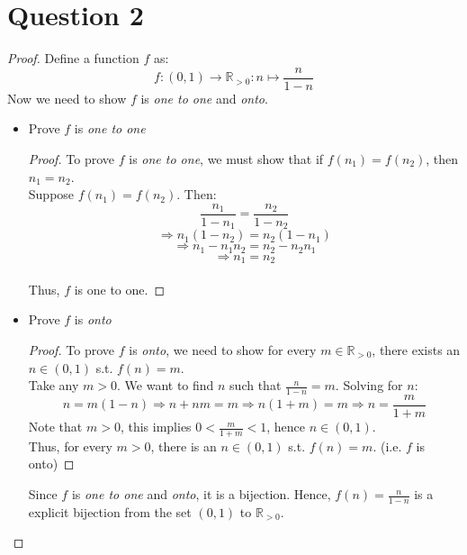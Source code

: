 \documentclass{article}
\begin{document}
\section*{Question 2}
\begin{proof}
    Define a function $f$ as:
    \[ f: (0,1) \rightarrow \mathbb{R}_{>0}: n \mapsto \frac{n}{1-n} \]
    Now we need to show $f$ is \textit{one to one} and \textit{onto}.
    \begin{itemize}
        \item Prove $f$ is \textit{one to one}
        \begin{proof}
            To prove $f$ is \textit{one to one}, we must show that if $f(n_1) = f(n_2)$, then $n_1 = n_2$.
            \\
            Suppose $f(n_1) = f(n_2)$. Then:
            \[ \frac{n_1}{1 - n_1} = \frac{n_2}{1 - n_2} \]
            \[ \Rightarrow n_1(1-n_2) = n_2(1-n_1) \]
            \[ \Rightarrow n_1 - n_1n_2 = n_2 - n_2n_1 \]
            \[ \Rightarrow n_1 = n_2 \]
            \\
            Thus, $f$ is one to one.
        \end{proof}
        \item Prove $f$ is \textit{onto}
        \begin{proof}
            To prove $f$ is \textit{onto}, we need to show for every $m \in \mathbb{R}_{>0}$, there exists an $n \in (0,1)$ s.t. $f(n) = m$.
            \\
            Take any $m > 0$. We want to find $n$ such that $\frac{n}{1 - n} = m$. Solving for $n$:
            \[ n = m(1 - n) \Rightarrow n + nm = m \Rightarrow n(1 + m) = m \Rightarrow n = \frac{m}{1 + m} \]
            Note that $m > 0$, this implies $0 < \frac{m}{1 + m} < 1$, hence $n \in (0,1)$.
            \\
            Thus, for every $m > 0$, there is an $n \in (0,1)$ s.t. $f(n) = m$. (i.e. $f$ is onto)
        \end{proof}
        Since $f$ is \textit{one to one} and \textit{onto}, it is a bijection. Hence, $f(n) = \frac{n}{1-n}$ is a explicit bijection from the set $(0,1)$ to $\mathbb{R}_{>0}$.
    \end{itemize}
\end{proof}
\end{document}
